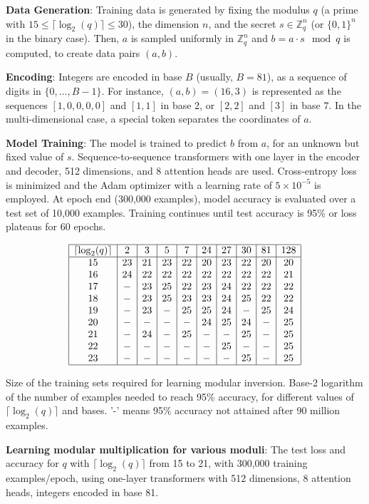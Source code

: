 \documentclass{article}
\begin{document}
\textbf{Data Generation}: Training data is generated by fixing the modulus \( q \) (a prime with \( 15 \leq \lceil \log_2(q) \rceil \leq 30 \)), the dimension \( n \), and the secret \( s \in \mathbb{Z}_q^n \) (or \( \{0, 1\}^n \) in the binary case). Then, \( a \) is sampled uniformly in \( \mathbb{Z}_q^n \) and \( b = a \cdot s \mod q \) is computed, to create data pairs \( (a, b) \).

\textbf{Encoding}: Integers are encoded in base \( B \) (usually, \( B = 81 \)), as a sequence of digits in \( \{0, \ldots, B-1\} \). For instance, \( (a, b) = (16, 3) \) is represented as the sequences \([1,0,0,0,0]\) and \([1,1]\) in base 2, or \([2,2]\) and \([3]\) in base 7. In the multi-dimensional case, a special token separates the coordinates of \( a \).

\textbf{Model Training}: The model is trained to predict \( b \) from \( a \), for an unknown but fixed value of \( s \). Sequence-to-sequence transformers with one layer in the encoder and decoder, 512 dimensions, and 8 attention heads are used. Cross-entropy loss is minimized and the Adam optimizer with a learning rate of \( 5 \times 10^{-5} \) is employed. At epoch end (300,000 examples), model accuracy is evaluated over a test set of 10,000 examples. Training continues until test accuracy is 95\% or loss plateaus for 60 epochs.

\begin{table}[h]
    \centering
    \[
    \begin{array}{|c|c|c|c|c|c|c|c|c|c|}
    \hline
    \lceil \log_2(q) \rceil & 2 & 3 & 5 & 7 & 24 & 27 & 30 & 81 & 128 \\
    \hline
    15 & 23 & 21 & 23 & 22 & 20 & 23 & 22 & 20 & 20 \\
    16 & 24 & 22 & 22 & 22 & 22 & 22 & 22 & 22 & 21 \\
    17 & - & 23 & 25 & 22 & 23 & 24 & 22 & 22 & 22 \\
    18 & - & 23 & 25 & 23 & 23 & 24 & 25 & 22 & 22 \\
    19 & - & 23 & - & 25 & 25 & 24 & - & 25 & 24 \\
    20 & - & - & - & - & 24 & 25 & 24 & - & 25 \\
    21 & - & 24 & - & 25 & - & - & 25 & - & 25 \\
    22 & - & - & - & - & - & 25 & - & - & 25 \\
    23 & - & - & - & - & - & - & 25 & - & 25 \\
    \hline
    \end{array}
    \]
    \caption{Size of the training sets required for learning modular inversion. Base-2 logarithm of the number of examples needed to reach 95\% accuracy, for different values of \( \lceil \log_2(q) \rceil \) and bases. '-' means 95\% accuracy not attained after 90 million examples.}
    \end{table}
\textbf{Learning modular multiplication for various moduli}: The test loss and accuracy for \( q \) with \( \lceil \log_2(q) \rceil \) from 15 to 21, with 300,000 training examples/epoch, using one-layer transformers with 512 dimensions, 8 attention heads, integers encoded in base 81.
\end{document}
